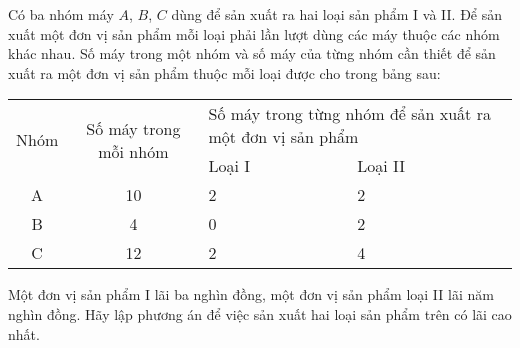 \begin{bt}%
	Có ba nhóm máy $A$, $B$, $C$ dùng để sản xuất ra hai loại sản phẩm I và II. Để sản xuất một đơn vị sản phẩm mỗi loại phải lần lượt dùng các máy thuộc các nhóm khác nhau. Số máy trong một nhóm và số máy của từng nhóm cần thiết để sản xuất ra một đơn vị sản phẩm thuộc mỗi loại  được cho trong bảng sau:
	\begin{center}
		\begin{tabular}{|c|c|p{2.5cm}|p{2.5cm}|}
			\hline 
			\multirow{2}{*}{Nhóm}& \multirow{2}{*}{Số máy trong mỗi nhóm}  & \multicolumn{2}{p{5cm}|}{Số máy trong từng nhóm để sản xuất ra một đơn vị sản phẩm} \\ 
			\cline{3-4} 
			&  & Loại I & Loại II  \\ 
			\hline 
			A & 10 & 2 & 2 \\ 
			\hline 
			B & 4 & 0 & 2 \\ 
			\hline 
			C & 12 & 2 & 4 \\ 
			\hline 
		\end{tabular} 
	\end{center}
	Một đơn vị sản phẩm I lãi ba nghìn đồng, một đơn vị sản phẩm loại II lãi năm nghìn đồng. Hãy lập phương án để việc sản xuất hai loại sản phẩm trên có lãi cao nhất. 
\end{bt}
